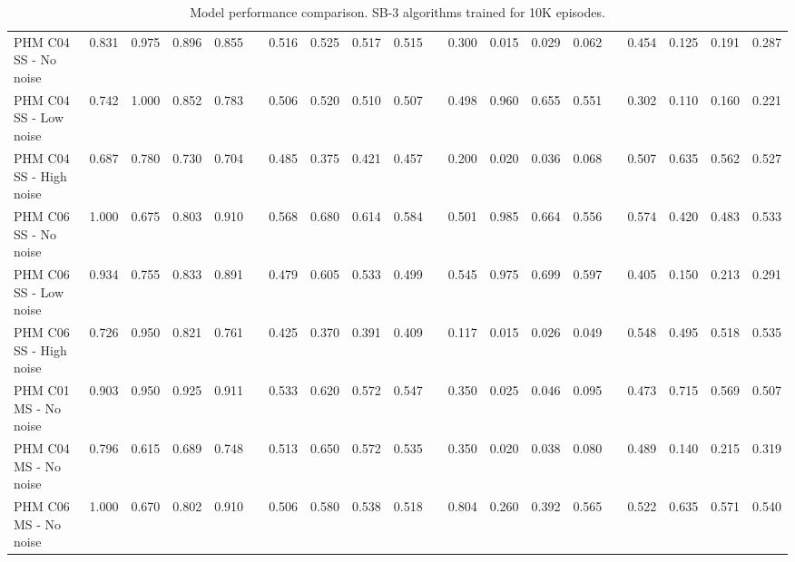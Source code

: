 \documentclass[]{article}
\begin{document}
\begin{landscape}
\begin{table*}
\begin{tabular}{@{}l rrrr c rrrr c rrrr c rrrr@{}}
			PHM C04 SS - No noise &0.831 &0.975 &0.896 & 0.855 & & 0.516 &0.525 &0.517 &0.515 & &0.300 &0.015 &0.029 &0.062 & &0.454 &0.125 &0.191&0.287\\
			PHM C04 SS - Low noise &0.742 &1.000 &0.852 & 0.783 & & 0.506 &0.520 &0.510 &0.507 & &0.498 &0.960 &0.655 &0.551 & &0.302 &0.110 &0.160&0.221\\
			PHM C04 SS - High noise &0.687 &0.780 &0.730 & 0.704 & & 0.485 &0.375 &0.421 &0.457 & &0.200 &0.020 &0.036 &0.068 & &0.507 &0.635 &0.562&0.527\\ \hdashline
			
			PHM C06 SS - No noise &1.000 &0.675 &0.803 & 0.910 & & 0.568 &0.680 &0.614 &0.584 & &0.501 &0.985 &0.664 &0.556 & &0.574 &0.420 &0.483&0.533\\
			PHM C06 SS - Low noise &0.934 &0.755 &0.833 & 0.891 & & 0.479 &0.605 &0.533 &0.499 & &0.545 &0.975 &0.699 &0.597 & &0.405 &0.150 &0.213&0.291\\
			PHM C06 SS - High noise &0.726 &0.950 &0.821 & 0.761 & & 0.425 &0.370 &0.391 &0.409 & &0.117 &0.015 &0.026 &0.049 & &0.548 &0.495 &0.518&0.535\\ \midrule
			
			PHM C01 MS - No noise &0.903 &0.950 &0.925 & 0.911 & & 0.533 &0.620 &0.572 &0.547 & &0.350 &0.025 &0.046 &0.095 & &0.473 &0.715 &0.569&0.507\\
			PHM C04 MS - No noise &0.796 &0.615 &0.689 & 0.748 & & 0.513 &0.650 &0.572 &0.535 & &0.350 &0.020 &0.038 &0.080 & &0.489 &0.140 &0.215&0.319\\
			PHM C06 MS - No noise &1.000 &0.670 &0.802 & 0.910 & & 0.506 &0.580 &0.538 &0.518 & &0.804 &0.260 &0.392 &0.565 & &0.522 &0.635 &0.571&0.540\\
			
\bottomrule
\end{tabular}
\caption{Model performance comparison. SB-3 algorithms trained for 10K episodes.}
\label{tbl:AllEnvs}
\end{table*}
\end{landscape}
\restoregeometry %
\end{document}
